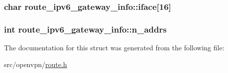 \subsubsection[{iface}]{\setlength{\rightskip}{0pt plus 5cm}char route\+\_\+ipv6\+\_\+gateway\+\_\+info\+::iface\mbox{[}16\mbox{]}}\label{structroute__ipv6__gateway__info_a4f309d5691cfa6b88d760f57695c4df5}
\hypertarget{structroute__ipv6__gateway__info_af97891fd9aa6799b8a58b3f0ada8e92d}{}
\subsubsection[{n\+\_\+addrs}]{\setlength{\rightskip}{0pt plus 5cm}int route\+\_\+ipv6\+\_\+gateway\+\_\+info\+::n\+\_\+addrs}\label{structroute__ipv6__gateway__info_af97891fd9aa6799b8a58b3f0ada8e92d}


The documentation for this struct was generated from the following file\+:\begin{DoxyCompactItemize}
\item 
src/openvpn/\hyperlink{route_8h}{route.\+h}\end{DoxyCompactItemize}
